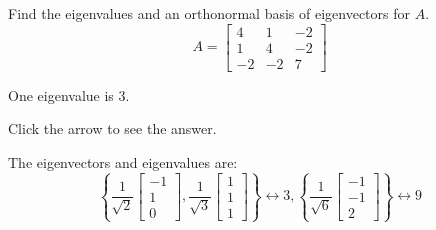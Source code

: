\documentclass{ximera}
\begin{document}
 \begin{problem}\label{prb:9.2} Find the eigenvalues and an orthonormal basis of eigenvectors for $A.$
\begin{equation*}
A=\left[
\begin{array}{rrr}
4 & 1 & -2 \\
1 & 4 & -2 \\
-2 & -2 & 7
\end{array}
\right]
\end{equation*}

\begin{hint} 
One eigenvalue is 3.

Click the arrow to see the answer. \begin{expandable}
The eigenvectors and eigenvalues are:
\[
\left\{ \frac{1}{\sqrt{2}}\left[
\begin{array}{r}
-1 \\
1 \\
0
\end{array}
\right] ,\frac{1}{\sqrt{3}}\left[
\begin{array}{c}
1 \\
1 \\
1
\end{array}
\right] \right\} \leftrightarrow 3,\left\{ \frac{1}{\sqrt{6}}\left[
\begin{array}{r}
-1 \\
-1 \\
2
\end{array}
\right] \right\} \leftrightarrow 9
\]
\end{expandable} \end{hint}
\end{problem}
\end{document}
